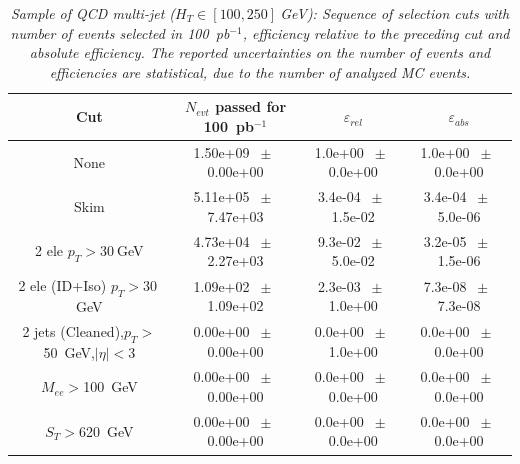 \begin{table}[htbp] 
\begin{center} 
\begin{tabular}{|c|c|c|c|} 
\hline\hline 
 Cut & $N_{evt}$ passed for 100~pb$^{-1}$ & $\varepsilon_{rel}$ & $\varepsilon_{abs}$ \\ 
\hline\hline 
None       &        1.50e+09       $~\pm~$       0.00e+00        &        1.0e+00       $~\pm~$       0.0e+00        &        1.0e+00       $~\pm~$       0.0e+00       \\       
       Skim       &        5.11e+05       $~\pm~$       7.47e+03        &        3.4e-04       $~\pm~$       1.5e-02        &        3.4e-04       $~\pm~$       5.0e-06       \\       
       2 ele $p_T>30~$GeV       &        4.73e+04       $~\pm~$       2.27e+03        &        9.3e-02       $~\pm~$       5.0e-02        &        3.2e-05       $~\pm~$       1.5e-06       \\       
       2 ele (ID+Iso) $p_T>30~$GeV       &        1.09e+02       $~\pm~$       1.09e+02        &        2.3e-03       $~\pm~$       1.0e+00        &        7.3e-08       $~\pm~$       7.3e-08       \\       
       2 jets (Cleaned),$p_T>$50~GeV,$|\eta|<$3       &        0.00e+00       $~\pm~$       0.00e+00        &        0.0e+00       $~\pm~$       1.0e+00        &        0.0e+00       $~\pm~$       0.0e+00       \\       
       $M_{ee}>$100~GeV       &        0.00e+00       $~\pm~$       0.00e+00        &        0.0e+00       $~\pm~$       0.0e+00        &        0.0e+00       $~\pm~$       0.0e+00       \\       
       $S_T>$620~GeV       &        0.00e+00       $~\pm~$       0.00e+00        &        0.0e+00       $~\pm~$       0.0e+00        &        0.0e+00       $~\pm~$       0.0e+00       \\       
       \hline\hline 
\end{tabular} 
\end{center} 
\caption{\small \sl Sample of QCD multi-jet ($H_T \in [100,250]~$GeV): Sequence of selection cuts with number of events selected in 100~pb$^{-1}$, efficiency relative to the preceding cut and absolute efficiency. The reported uncertainties on the number of events and efficiencies are statistical, due to the number of analyzed MC events.} 
\label{tab:effic-QCD-100-250} 
\end{table} 

